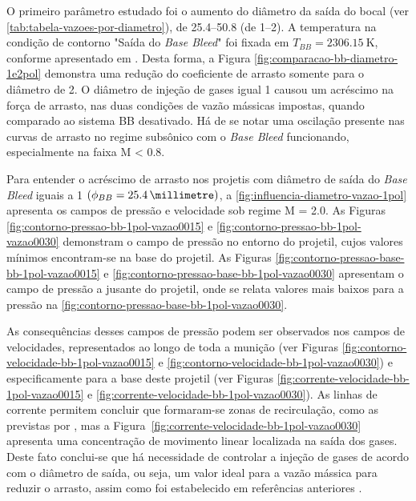O primeiro parâmetro estudado foi o aumento do diâmetro da saída do bocal (ver \autoref{tab:tabela-vazoes-por-diametro}), de \qtyrange{25,4}{50,8}{\millimetre} (de \qtyrange{1}{2}{\polegada}). A temperatura na condição de contorno "Saída do \textit{Base Bleed}"{} foi fixada em \(T_{BB} = \qty{2306,15}{\kelvin}\), conforme apresentado em \cite{Gil2020}. Desta forma, a Figura \ref{fig:comparacao-bb-diametro-1e2pol} demonstra uma redução do coeficiente de arrasto somente para o diâmetro de \qty{2}{\polegada}. O diâmetro de injeção de gases igual \qty{1}{\polegada} causou um acréscimo na força de arrasto, nas duas condições de vazão mássicas impostas, quando comparado ao sistema BB desativado. Há de se notar uma oscilação presente nas curvas de arrasto no regime subsônico com o \textit{Base Bleed} funcionando, especialmente na faixa M < \num{0,8}.

Para entender o acréscimo de arrasto nos projetis com diâmetro de saída do \textit{Base Bleed} iguais a \qty{1}{\polegada} \(\left(\phi_{BB} = \qty{25,4}{\millimetre}\right)\), a \autoref{fig:influencia-diametro-vazao-1pol} apresenta os campos de pressão e velocidade sob regime M = \num{2,0}. As Figuras \ref{fig:contorno-pressao-bb-1pol-vazao0015} e \ref{fig:contorno-pressao-bb-1pol-vazao0030} demonstram o campo de pressão no entorno do projetil, cujos valores mínimos encontram-se na base do projetil. As Figuras \ref{fig:contorno-pressao-base-bb-1pol-vazao0015} e \ref{fig:contorno-pressao-base-bb-1pol-vazao0030} apresentam o campo de pressão a jusante do projetil, onde se relata valores mais baixos para a pressão na \autoref{fig:contorno-pressao-base-bb-1pol-vazao0030}.  

As consequências desses campos de pressão podem ser observados nos campos de velocidades, representados ao longo de toda a munição (ver Figuras \ref{fig:contorno-velocidade-bb-1pol-vazao0015} e \ref{fig:contorno-velocidade-bb-1pol-vazao0030}) e especificamente para a base deste projetil (ver Figuras \ref{fig:corrente-velocidade-bb-1pol-vazao0015} e \ref{fig:corrente-velocidade-bb-1pol-vazao0030}). As linhas de corrente permitem concluir que formaram-se zonas de recirculação, como as previstas por \cite{Sahu1985}, mas a Figura~\ref{fig:corrente-velocidade-bb-1pol-vazao0030} apresenta uma concentração de movimento linear localizada na saída dos gases. Deste fato conclui-se que há necessidade de controlar a injeção de gases de acordo com o diâmetro de saída, ou seja, um valor ideal para a vazão mássica para reduzir o arrasto, assim como foi estabelecido em referências anteriores \cite{Andersson1976,Gunners1988}. 

